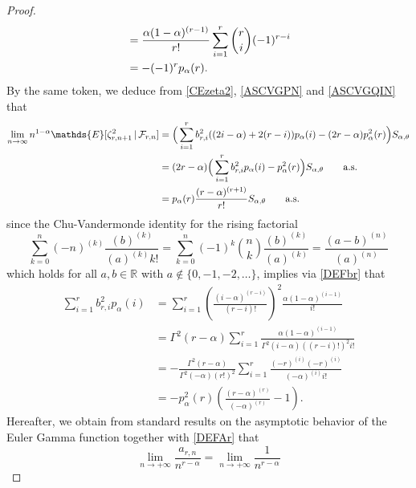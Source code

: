 \documentclass[10pt,a4paper]{amsart}
\newcommand{\E}{\mathds{E}}
\newcommand{\dR}{\mathbb{R}}
\begin{document}
\begin{proof}
\begin{align}
&=\frac{\alpha(1-\alpha)^{(r-1)}}{r!} \sum_{i=1}^{r} \binom{r}{i} (-1)^{r-i} \notag \\
&=-(-1)^r  p_{\alpha}(r).
\label{BinomialBP}
\end{align}
By the same token, we deduce from \eqref{CEzeta2}, \eqref{ASCVGPN} and \eqref{ASCVGQIN} that 
\begin{align}
\label{ASCVGPCEzetar2}
\lim_{n \rightarrow \infty} n^{1-\alpha} \E[\zeta_{r,n+1}^2\,|\,\mathcal{F}_{r,n}]
&= \Big( \sum_{i=1}^{r}b_{r,i}^2 ((2i - \alpha)+2(r-i)) p_{\alpha}(i) - (2r-\alpha)p_{\alpha}^2(r) \Big)S_{\alpha, \theta} \notag \\  
&= (2r- \alpha) \Big( \sum_{i=1}^{r}b_{r,i}^2  p_{\alpha}(i) - p_{\alpha}^2(r) \Big)S_{\alpha, \theta} 
\qquad \text{a.s.} \notag \\  
&=  p_{\alpha}(r) 
\frac{(r-\alpha)^{(r+1)}}{r!} S_{\alpha, \theta}  \qquad \text{a.s.}
\end{align}
since the Chu-Vandermonde identity for the rising factorial
\begin{equation}
\label{ChuVan}
\sum_{k=0}^n (-n)^{(k)} \frac{(b)^{(k)}}{(a)^{(k)} k!}
= \sum_{k=0}^n (-1)^{k} \binom{n}{k} \frac{(b)^{(k)}}{(a)^{(k)}}= \frac{(a-b)^{(n)}}{(a)^{(n)}}
\end{equation}
which holds for all $a,b \in \dR$ with $a \notin \{0,-1,-2,\ldots\}$, implies via \eqref{DEFbr} that
\begin{align*}
\sum_{i=1}^{r}b_{r,i}^2  p_{\alpha}(i)&=\sum_{i=1}^{r}\left(\frac{(i-\alpha)^{(r-i)}}{(r-i)!}\right)^{2}\frac{\alpha(1-\alpha)^{(i-1)}}{i!}\\
&=\Gamma^2(r-\alpha)\sum_{i=1}^{r}\frac{\alpha(1-\alpha)^{(i-1)}}{\Gamma^2(i-\alpha)((r-i)!)^{2}i!}\\
&=-\frac{\Gamma^2(r-\alpha)}{\Gamma^2(-\alpha)(r!)^{2}}\sum_{i=1}^{r}\frac{(-r)^{(i)}(-r)^{(i)}}{(-\alpha)^{(i)}i!}\\
&=-p_\alpha^2(r)\left(\frac{(r-\alpha)^{(r)}}{(-\alpha)^{(r)}}-1\right).
\end{align*}
Hereafter, we obtain from standard results on the asymptotic behavior of
the Euler Gamma function together with \eqref{DEFAr} that
\begin{equation}
\label{CVGANr}
\lim_{n\rightarrow+\infty} \frac{a_{r,n}}{n^{r-\alpha}}=\lim_{n\rightarrow+\infty}\frac{1}{n^{r-\alpha}}

\end{equation}
\end{proof}
\end{document}
